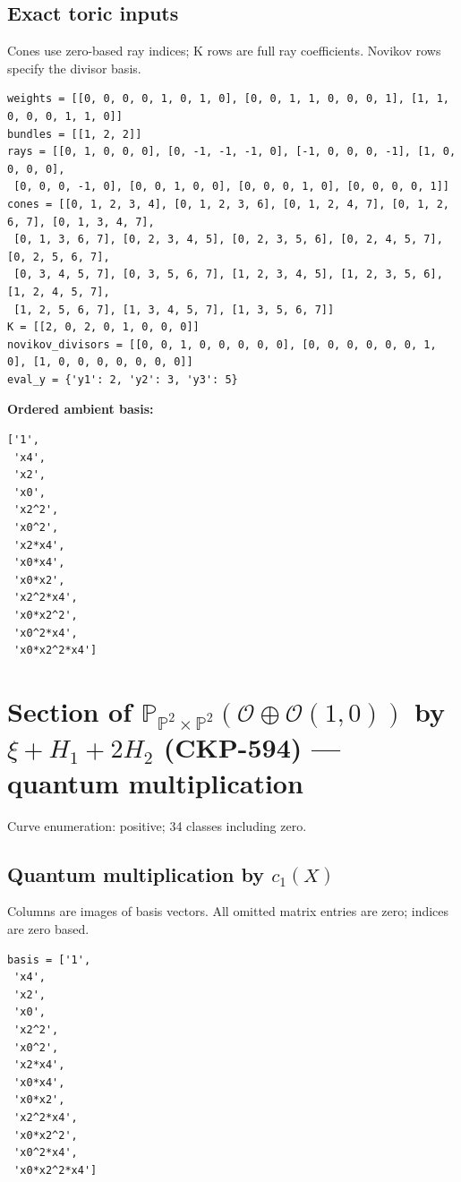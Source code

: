 \documentclass[10pt,a4paper]{article}
\begin{document}
\subsection*{Exact toric inputs}
Cones use zero-based ray indices; K rows are full ray coefficients. Novikov rows specify the divisor basis.

\begin{lstlisting}
weights = [[0, 0, 0, 0, 1, 0, 1, 0], [0, 0, 1, 1, 0, 0, 0, 1], [1, 1, 0, 0, 0, 1, 1, 0]]
bundles = [[1, 2, 2]]
rays = [[0, 1, 0, 0, 0], [0, -1, -1, -1, 0], [-1, 0, 0, 0, -1], [1, 0, 0, 0, 0],
 [0, 0, 0, -1, 0], [0, 0, 1, 0, 0], [0, 0, 0, 1, 0], [0, 0, 0, 0, 1]]
cones = [[0, 1, 2, 3, 4], [0, 1, 2, 3, 6], [0, 1, 2, 4, 7], [0, 1, 2, 6, 7], [0, 1, 3, 4, 7],
 [0, 1, 3, 6, 7], [0, 2, 3, 4, 5], [0, 2, 3, 5, 6], [0, 2, 4, 5, 7], [0, 2, 5, 6, 7],
 [0, 3, 4, 5, 7], [0, 3, 5, 6, 7], [1, 2, 3, 4, 5], [1, 2, 3, 5, 6], [1, 2, 4, 5, 7],
 [1, 2, 5, 6, 7], [1, 3, 4, 5, 7], [1, 3, 5, 6, 7]]
K = [[2, 0, 2, 0, 1, 0, 0, 0]]
novikov_divisors = [[0, 0, 1, 0, 0, 0, 0, 0], [0, 0, 0, 0, 0, 0, 1, 0], [1, 0, 0, 0, 0, 0, 0, 0]]
eval_y = {'y1': 2, 'y2': 3, 'y3': 5}
\end{lstlisting}

\textbf{Ordered ambient basis:}
\begin{lstlisting}
['1',
 'x4',
 'x2',
 'x0',
 'x2^2',
 'x0^2',
 'x2*x4',
 'x0*x4',
 'x0*x2',
 'x2^2*x4',
 'x0*x2^2',
 'x0^2*x4',
 'x0*x2^2*x4']
\end{lstlisting}

\clearpage\section*{Section of $\mathbb P_{\mathbb P^{2}\times \mathbb P^{2}}(\mathcal O\oplus \mathcal O(1,0))$ by $\xi +H_{1}+2H_{2}$ (CKP-594) --- quantum multiplication}

Curve enumeration: positive; 34 classes including zero.
\subsection*{Quantum multiplication by $c_1(X)$}
Columns are images of basis vectors. All omitted matrix entries are zero; indices are zero based.

\begin{lstlisting}
basis = ['1',
 'x4',
 'x2',
 'x0',
 'x2^2',
 'x0^2',
 'x2*x4',
 'x0*x4',
 'x0*x2',
 'x2^2*x4',
 'x0*x2^2',
 'x0^2*x4',
 'x0*x2^2*x4']
\end{lstlisting}
\end{document}
